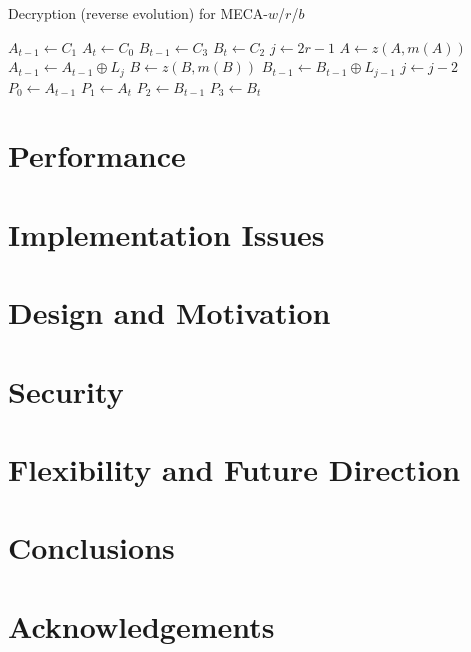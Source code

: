 \documentclass{article}
\begin{document}
\begin{algorithm}[H]
  \begin{algorithmic}
    \caption{Decryption (reverse evolution) for MECA-$w$/$r$/$b$}\label{alg:decryption}
    \Input
    \EndInput
    \Output
    \EndOutput
    \State $A_{t-1} \gets C_1$
    \State $A_{t} \gets C_0$
	\State $B_{t-1} \gets C_3$
	\State $B_{t} \gets C_2$
	\State $j \gets 2r-1$
		\State $A \gets z(A, m(A))$
		\State $A_{t-1} \gets A_{t-1} \oplus L_j$
		\State $B \gets z(B, m(B))$
		\State $B_{t-1} \gets B_{t-1} \oplus L_{j-1}$
		\State $j \gets j - 2$
    \EndFor
    \State $P_0 \gets A_{t-1}$
    \State $P_1 \gets A_{t}$
    \State $P_2 \gets B_{t-1}$
    \State $P_3 \gets B_{t}$
  \end{algorithmic}
\end{algorithm}

\section{Performance}

\section{Implementation Issues}

\section{Design and Motivation}

\section{Security}

\section{Flexibility and Future Direction}

\section{Conclusions}

\section{Acknowledgements}
\end{document}
